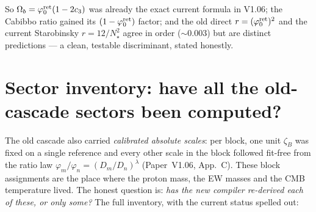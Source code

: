 \noindent So $\Omega_b=\varphi_0^{\mathrm{ret}}(1-2c_3)$ was already the exact current formula in V1.06; the Cabibbo
ratio gained its $(1-\varphi_0^{\mathrm{ret}})$ factor; and the old direct $r=(\varphi_0^{\mathrm{ret}})^2$ and the current Starobinsky
$r=12/N_\star^2$ agree in order ($\sim0.003$) but are distinct predictions --- a clean, testable
discriminant, stated honestly.

\section{Sector inventory: have all the old-cascade sectors been computed?}\label{sec:sectorcov}
The old cascade also carried \emph{calibrated absolute scales}: per block, one unit $\zeta_B$ was fixed on
a single reference and every other scale in the block followed fit-free from the ratio law
$\varphi_m/\varphi_n=(D_m/D_n)^\lambda$ (Paper~V1.06, App.~C). These block assignments are the place where
the proton mass, the EW masses and the CMB temperature lived. The honest question is: \emph{has the new
compiler re-derived each of these, or only some?} The full inventory, with the current status spelled out:

